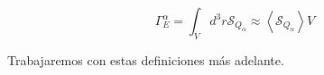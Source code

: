     \begin{equation}
      \Gamma_E^\alpha = \int_Vd^3r \mathcal{S}_{Q_\alpha} \approx \left<\mathcal{S}_{Q_\alpha}\right>V
    \end{equation}

   Trabajaremos con estas definiciones m\'as adelante.

   

   

   
